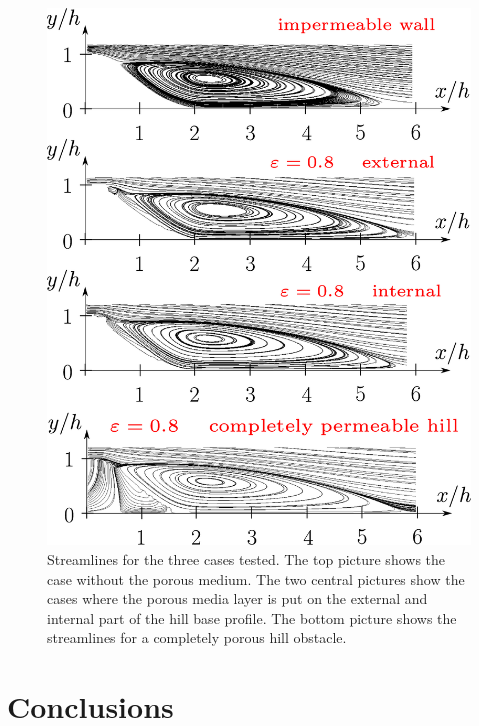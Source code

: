\begin{figure}[H]
	\centering
	\includegraphics[width=0.85\linewidth]{chapter_5/figure/streamlines}
	\caption{Streamlines for the three cases tested. The top picture shows the case without the porous medium. The two central pictures show the cases where the porous media layer is put on the external and internal part of the hill base profile. The bottom picture shows the streamlines for a completely porous hill obstacle.}
	\label{fig:streamlines}
\end{figure}



\section{Conclusions}

